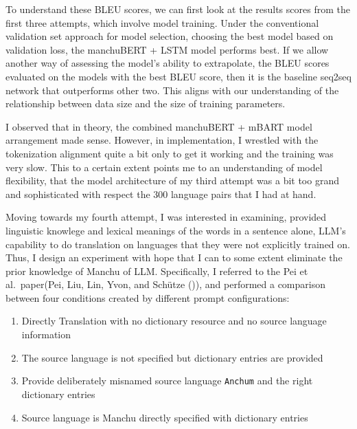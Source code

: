 \documentclass[
  letterpaper,
  DIV=11,
  numbers=noendperiod]{scrartcl}
\providecommand{\tightlist}{%
  \setlength{\itemsep}{0pt}\setlength{\parskip}{0pt}}\usepackage{longtable,booktabs,array}
\begin{document}
To understand these BLEU scores, we can first look at the results scores
from the first three attempts, which involve model training. Under the
conventional validation set approach for model selection, choosing the
best model based on validation loss, the manchuBERT + LSTM model
performs best. If we allow another way of assessing the model's ability
to extrapolate, the BLEU scores evaluated on the models with the best
BLEU score, then it is the baseline seq2seq network that outperforms
other two. This aligns with our understanding of the relationship
between data size and the size of training parameters.

I observed that in theory, the combined manchuBERT + mBART model
arrangement made sense. However, in implementation, I wrestled with the
tokenization alignment quite a bit only to get it working and the
training was very slow. This to a certain extent points me to an
understanding of model flexibility, that the model architecture of my
third attempt was a bit too grand and sophisticated with respect the 300
language pairs that I had at hand.

Moving towards my fourth attempt, I was interested in examining,
provided linguistic knowlege and lexical meanings of the words in a
sentence alone, LLM's capability to do translation on languages that
they were not explicitly trained on. Thus, I design an experiment with
hope that I can to some extent eliminate the prior knowledge of Manchu
of LLM. Specifically, I referred to the Pei et al.~paper(Pei, Liu, Lin,
Yvon, and Schütze
()),
and performed a comparison between four conditions created by different
prompt configurations:

\begin{enumerate}
\def\labelenumi{\arabic{enumi}.}
\tightlist
\item
  Directly Translation with no dictionary resource and no source
  language information
\item
  The source language is not specified but dictionary entries are
  provided
\item
  Provide deliberately misnamed source language \texttt{Anchum} and the
  right dictionary entries
\item
  Source language is Manchu directly specified with dictionary entries
\end{enumerate}
\end{document}
